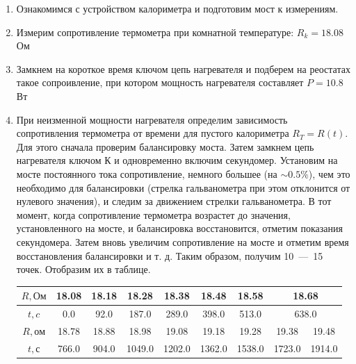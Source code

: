 \documentclass[12pt,a4paper]{article}
\begin{document}
	\begin{enumerate}
		\item Ознакомимся с устройством калориметра и подготовим мост к измерениям.
		
		\item Измерим сопротивление термометра при комнатной температуре: $R_k = 18.08$ Ом
		
		\item Замкнем на короткое время ключом цепь нагревателя и подберем на реостатах такое сопроивление, при котором мощность нагревателя составляет $P = 10.8$ Вт
		
		\item При неизменной мощности нагревателя определим зависимость сопротивления термометра от времени для пустого калориметра $R_T = R(t)$. Для этого сначала проверим балансировку моста. Затем замкнем цепь нагревателя ключом К и одновременно включим секундомер. Установим на мосте постоянного тока сопротивление, немного большее (на $\sim 0.5 \%$), чем это необходимо для балансировки (стрелка гальванометра при этом отклонится от нулевого значения), и следим за движением стрелки гальванометра. В тот момент, когда сопротивление термометра возрастет до значения, установленного на мосте, и балансировка восстановится, отметим показания секундомера. Затем вновь увеличим сопротивление на мосте и отметим время восстановления балансировки и т. д. Таким образом, получим 10~---~15 точек. Отобразим их в таблице.
		
		\begin{center}
			\begin{tabular}{|c|c|c|c|c|c|c|c|c|} \hline
				$R, Ом$ & 18.08 & 18.18 & 18.28 & 18.38 & 18.48 & 18.58 & \multicolumn{2}{|c|}{18.68} \\ \hline
				$t, c$ & 0.0 & 92.0 & 187.0 & 289.0 & 398.0 & 513.0 & \multicolumn{2}{|c|}{638.0} \\ \hline
				$R, ом$ & 18.78 & 18.88 & 18.98 & 19.08 & 19.18 & 19.28 & 19.38 & 19.48 \\ \hline
				$t, с$ & 766.0 & 904.0 & 1049.0 & 1202.0 & 1362.0 & 1538.0 & 1723.0 & 1914.0 \\ \hline
			\end{tabular}
		\end{center}
		

\end{enumerate}
\end{document}
